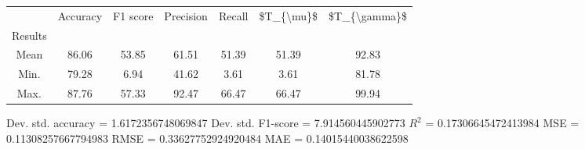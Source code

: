 \begin{tabular}{|c|c|c|c|c|c|c|}
\toprule
{} &  Accuracy &  F1 score &  Precision &  Recall &  \$T\_\{\textbackslash mu\}\$ &  \$T\_\{\textbackslash gamma\}\$ \\
Results &           &           &            &         &            &               \\
\hline
Mean    &     86.06 &     53.85 &      61.51 &   51.39 &      51.39 &         92.83 \\
Min.    &     79.28 &      6.94 &      41.62 &    3.61 &       3.61 &         81.78 \\
Max.    &     87.76 &     57.33 &      92.47 &   66.47 &      66.47 &         99.94 \\
\bottomrule
\end{tabular}

 Dev. std. accuracy = 1.6172356748069847
 Dev. std. F1-score = 7.914560445902773
 $R^2$ = 0.17306645472413984
 MSE = 0.11308257667794983
 RMSE = 0.33627752924920484
 MAE = 0.14015440038622598